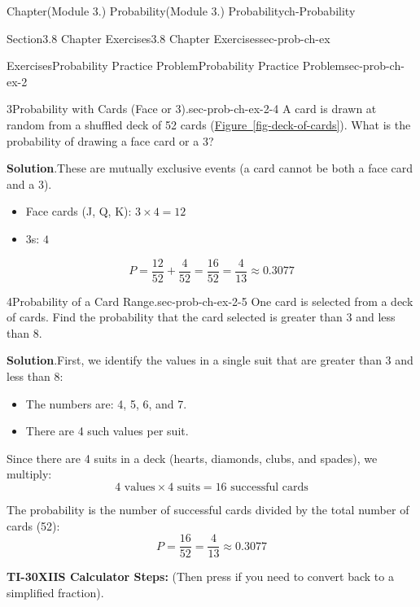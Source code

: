 \documentclass[oneside,10pt,]{book}
\newcommand{\blocktitlefont}{\relax}
\newcommand{\xreffont}{\relax}
\newcommand{\ptxlistdisc}{\raisebox{0.3ex}{\textbullet}}
\newcommand{\terminology}[1]{\textbf{#1}}
\newcommand{\kbd}[1]{\keys{{#1}}}
\begin{document}
\begin{chapterptx}{Chapter}{(Module 3.) Probability}{}{(Module 3.) Probability}{}{}{ch-Probability}
\begin{sectionptx}{Section}{3.8 Chapter Exercises}{}{3.8 Chapter Exercises}{}{}{sec-prob-ch-ex}
\begin{exercises-subsection-numberless}{Exercises}{Probability Practice Problem}{}{Probability Practice Problem}{}{}{sec-prob-ch-ex-2}
\begin{divisionexercise}{3}{Probability with Cards (Face or 3).}{}{sec-prob-ch-ex-2-4}
A card is drawn at random from a shuffled deck of 52 cards (\hyperref[fig-deck-of-cards]{Figure~{\xreffont\ref{fig-deck-of-cards}}}). What is the probability of drawing a face card or a 3?%
\par\smallskip%
\noindent\textbf{\blocktitlefont Solution}.\hypertarget{sec-prob-ch-ex-2-4-3}{}\quad{}These are mutually exclusive events (a card cannot be both a face card and a 3).%
\begin{itemize}[label=\ptxlistdisc]
\item{}Face cards (J, Q, K): \(3 \times 4 = 12\)%
\item{}3s: \(4\)%
\end{itemize}
%
\begin{equation*}
P = \frac{12}{52} + \frac{4}{52} = \frac{16}{52} = \frac{4}{13} \approx 0.3077
\end{equation*}
%
\end{divisionexercise}%
\begin{divisionexercise}{4}{Probability of a Card Range.}{}{sec-prob-ch-ex-2-5}%
One card is selected from a deck of cards. Find the probability that the card selected is greater than 3 and less than 8.%
\par\smallskip%
\noindent\textbf{\blocktitlefont Solution}.\hypertarget{sec-prob-ch-ex-2-5-3}{}\quad{}First, we identify the values in a single suit that are greater than 3 and less than 8:%
\begin{itemize}[label=\ptxlistdisc]
\item{}The numbers are: 4, 5, 6, and 7.%
\item{}There are 4 such values per suit.%
\end{itemize}
%
\par
Since there are 4 suits in a deck (hearts, diamonds, clubs, and spades), we multiply:%
\begin{equation*}
4 \text{ values} \times 4 \text{ suits} = 16 \text{ successful cards}
\end{equation*}
%
\par
The probability is the number of successful cards divided by the total number of cards (52):%
\begin{equation*}
P = \frac{16}{52} = \frac{4}{13} \approx 0.3077
\end{equation*}
%
\par
\terminology{TI-30XIIS Calculator Steps:} \kbd{16} \kbd{÷} \kbd{52} \kbd{ENTER} (Then press \kbd{2nd} \kbd{PRB} if you need to convert back to a simplified fraction).%
\end{divisionexercise}%

\end{exercises-subsection-numberless}
\end{sectionptx}
\end{chapterptx}
\end{document}

